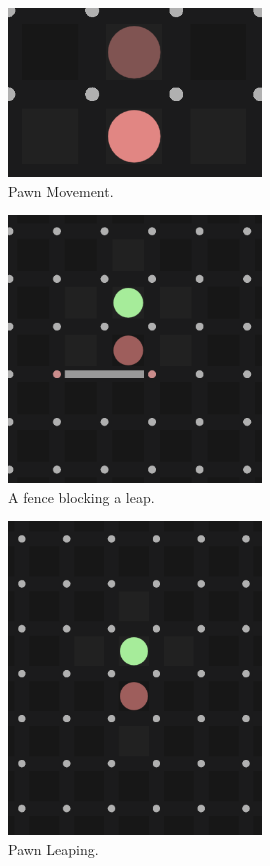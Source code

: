 \documentclass[progress]{cmpreport}
\begin{document}
\begin{figure}[h]   
    \centering
    \includegraphics[width=0.6\textwidth]{images/pawn_movement.png}
    \caption{Pawn Movement.}
    \label{fig:pawn_movement}
\end{figure}
\begin{figure}[h]
    \centering
    \includegraphics[width=0.6\textwidth]{images/fence_blocking_leap.png}
    \caption{A fence blocking a leap.}
    \label{fig:fence_blocking_leap}
\end{figure}
\begin{figure}[h]
    \centering
    \includegraphics[width=0.6\textwidth]{images/pawn_leaping.png}
    \caption{Pawn Leaping.}
    \label{fig:pawn_leaping}
\end{figure}
\end{document}
